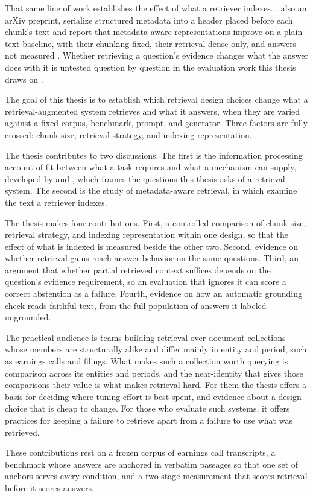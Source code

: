 That same line of work establishes the effect of what a retriever indexes.
\textcite[5, 9]{yousuf2026}, also an arXiv preprint, serialize structured
metadata into a header placed
before each chunk's text and report that metadata-aware representations improve
on a plain-text baseline, with their chunking fixed, their retrieval dense only,
and answers not measured \parencite[7--8, 13]{yousuf2026}. Whether retrieving a
question's evidence changes what the answer does with it is untested question by
question in the evaluation work this thesis draws on
\parencite{kobeissi2026,es2024,saad-falcon2024}.

The goal of this thesis is to establish which retrieval design choices change
what a retrieval-augmented system retrieves and what it answers, when they are
varied against a fixed corpus, benchmark, prompt, and generator. Three factors
are fully crossed: chunk size, retrieval strategy, and indexing representation.

The thesis contributes to two discussions. The first is the information
processing account of fit between what a task requires and what a mechanism can
supply, developed by \textcite{tushman1978} and \textcite{galbraith1974}, which
frames the questions this thesis asks of a retrieval system. The second is the
study of metadata-aware retrieval, in which \textcite{yousuf2026} examine the
text a retriever indexes.

The thesis makes four contributions. First, a controlled comparison of chunk
size, retrieval strategy, and indexing representation within one design, so that
the effect of what is indexed is measured beside the other two. Second, evidence
on whether retrieval gains reach answer behavior on the same questions. Third,
an argument that whether partial retrieved context suffices depends on the
question's evidence requirement, so an evaluation that ignores it can score a
correct abstention as a failure. Fourth, evidence on how an automatic grounding
check reads faithful text, from the full population of answers it labeled
ungrounded.

The practical audience is teams building retrieval over document collections
whose members are structurally alike and differ mainly in entity and period,
such as earnings calls and filings. What makes such a collection worth querying
is comparison across its entities and periods, and the near-identity that gives
those comparisons their value is what makes retrieval hard. For them
the thesis offers a basis for deciding where tuning effort is best spent, and
evidence about a design choice that is cheap to change. For those who evaluate
such systems, it offers practices for keeping a failure to retrieve apart from a
failure to use what was retrieved.

These contributions rest on a frozen corpus of earnings call transcripts, a
benchmark whose answers are anchored in verbatim passages so that one set of
anchors serves every condition, and a two-stage measurement that scores
retrieval before it scores answers.
